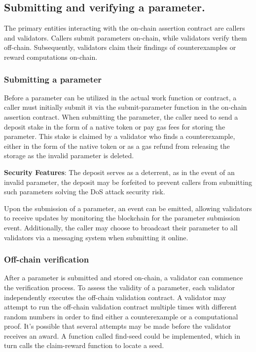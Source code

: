 \documentclass[runningheads]{llncs}
\begin{document}
\subsection{Submitting and verifying a parameter.} The primary entities interacting with the on-chain assertion contract are callers and validators. Callers submit parameters on-chain, while validators verify them off-chain. Subsequently, validators claim their findings of counterexamples or reward computations on-chain. 
\subsubsection{Submitting a parameter} 
Before a parameter can be utilized in the actual work function or contract, a caller must initially submit it via the submit-parameter function in the on-chain assertion contract. When submitting the parameter, the caller need to send a deposit stake in the form of a native token or pay gas fees for storing the parameter. This stake is claimed by a validator who finds a counterexample, either in the form of the native token or as a gas refund from releasing the storage as the invalid parameter is deleted.

\textbf{Security Features}: 
The deposit serves as a deterrent, as in the event of an invalid parameter, the deposit may be forfeited to prevent callers from submitting such parameters solving the DoS attack security risk. 

Upon the submission of a parameter, an event can be emitted, allowing validators to receive updates by monitoring the blockchain for the parameter submission event. Additionally, the caller may choose to broadcast their parameter to all validators via a messaging system when submitting it online.

\subsubsection{Off-chain verification}

After a parameter is submitted and stored on-chain, a validator can commence the verification process. To assess the validity of a parameter, each validator independently executes the off-chain validation contract. A validator may attempt to run the off-chain validation contract multiple times with different random numbers in order to find either a counterexample or a computational proof. It's possible that several attempts may be made before the validator receives an award.  A function called find-seed could be implemented, which in turn calls the claim-reward function to locate a seed.
\end{document}
